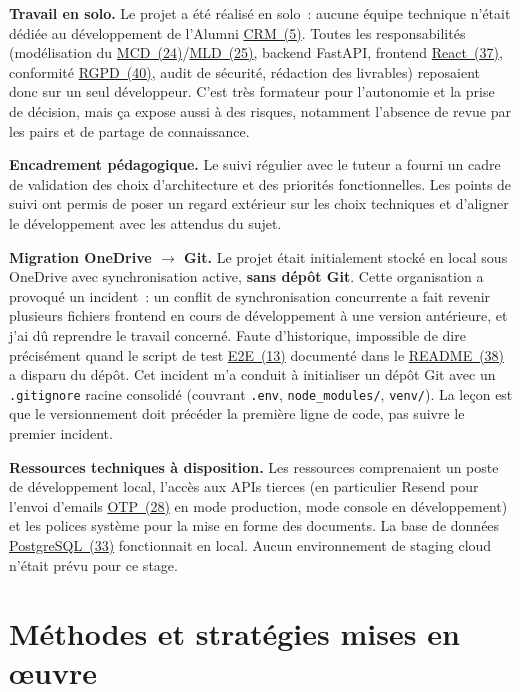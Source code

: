 \documentclass[12pt,a4paper]{report}
\begin{document}
\textbf{Travail en solo.} Le projet a été réalisé en solo~: aucune équipe technique n'était dédiée au développement de l'Alumni \hyperlink{abbr-CRM}{CRM~(5)}. Toutes les responsabilités (modélisation du \hyperlink{abbr-MCD}{MCD~(24)}/\hyperlink{abbr-MLD}{MLD~(25)}, backend FastAPI, frontend \hyperlink{abbr-React}{React~(37)}, conformité \hyperlink{abbr-RGPD}{RGPD~(40)}, audit de sécurité, rédaction des livrables) reposaient donc sur un seul développeur. C'est très formateur pour l'autonomie et la prise de décision, mais ça expose aussi à des risques, notamment l'absence de revue par les pairs et de partage de connaissance.

\textbf{Encadrement pédagogique.} Le suivi régulier avec le tuteur a fourni un cadre de validation des choix d'architecture et des priorités fonctionnelles. Les points de suivi ont permis de poser un regard extérieur sur les choix techniques et d'aligner le développement avec les attendus du sujet.

\textbf{Migration OneDrive $\rightarrow$ Git.} Le projet était initialement stocké en local sous OneDrive avec synchronisation active, \textbf{sans dépôt Git}. Cette organisation a provoqué un incident~: un conflit de synchronisation concurrente a fait revenir plusieurs fichiers frontend en cours de développement à une version antérieure, et j'ai dû reprendre le travail concerné. Faute d'historique, impossible de dire précisément quand le script de test \hyperlink{abbr-E2E}{E2E~(13)} documenté dans le \hyperlink{abbr-README}{README~(38)} a disparu du dépôt. Cet incident m'a conduit à initialiser un dépôt Git avec un \texttt{.gitignore} racine consolidé (couvrant \texttt{.env}, \texttt{node\_modules/}, \texttt{venv/}). La leçon est que le versionnement doit précéder la première ligne de code, pas suivre le premier incident.

\textbf{Ressources techniques à disposition.} Les ressources comprenaient un poste de développement local, l'accès aux APIs tierces (en particulier Resend pour l'envoi d'emails \hyperlink{abbr-OTP}{OTP~(28)} en mode production, mode console en développement) et les polices système pour la mise en forme des documents. La base de données \hyperlink{abbr-PostgreSQL}{PostgreSQL~(33)} fonctionnait en local. Aucun environnement de staging cloud n'était prévu pour ce stage.

\section{Méthodes et stratégies mises en œuvre}
\end{document}

